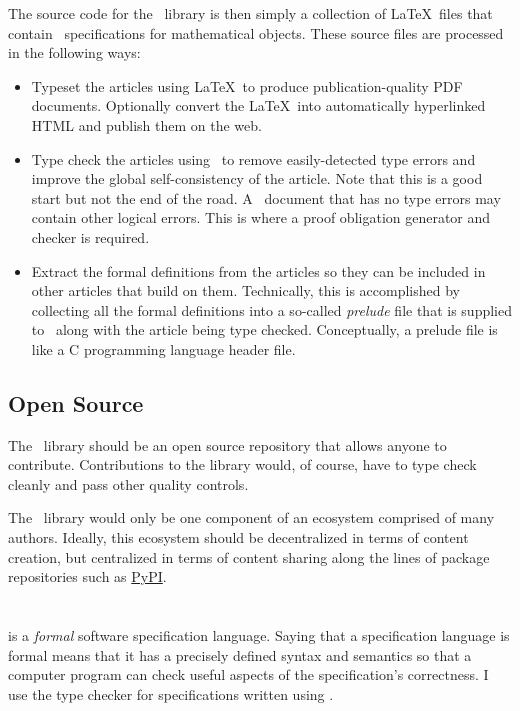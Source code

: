 \documentclass{amsart}
\begin{document}
The source code for the \mathz\ library is then simply a collection of \LaTeX\ files that contain \ZN\ specifications for mathematical objects.
These source files are processed in the following ways:
\begin{itemize}
\item Typeset the articles using \LaTeX\ to produce publication-quality PDF documents.
Optionally convert the \LaTeX\ into automatically hyperlinked HTML and publish them on the web.
\item Type check the articles using \fuzz\ to remove easily-detected type errors and improve the global self-consistency of the article.
Note that this is a good start but not the end of the road. 
A \ZN\ document that has no type errors may contain other logical errors.
This is where a proof obligation generator and checker is required.
\item Extract the formal definitions from the articles so they can be included in other articles that build on them.
Technically, this is accomplished by collecting all the formal definitions into a so-called \textit{prelude} file that
is supplied to \fuzz\ along with the article being type checked.
Conceptually, a prelude file is like a C programming language header file.
\end{itemize}

\subsection{Open Source}

The \mathz\ library should be an open source repository that allows anyone to contribute.
Contributions to the library would, of course, have to type check cleanly and pass other quality controls.

The \mathz\ library would only be one component of an ecosystem comprised of many authors.
Ideally, this ecosystem should be decentralized in terms of content creation, but centralized in terms
of content sharing along the lines of package repositories such as \href{https://pypi.org}{PyPI}.

\section{\ZN}

\ZN\cite{spivey-zrm} is a \textit{formal} software specification language.
Saying that a specification language is formal means that it has a precisely defined syntax and semantics so that 
a computer program can check useful aspects of the specification's correctness.
I use the \fuzz\cite{spivey-fm} type checker for specifications written using \ZN.
\end{document}
